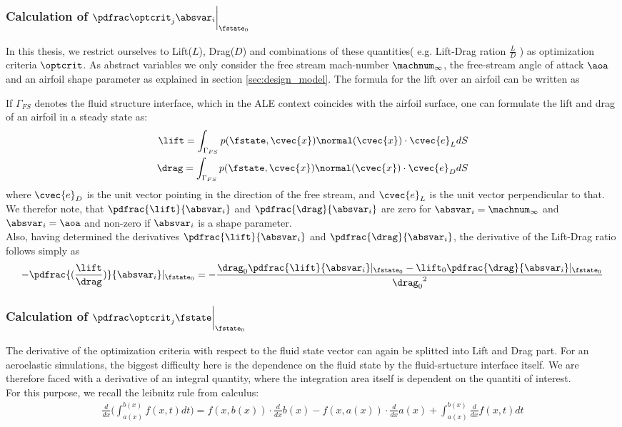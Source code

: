 \documentclass[../main.tex]{subfiles}
\begin{document}
\subsubsection{Calculation of $\PoptcritJBYabsvarI\bigg\rvert_{\fstate_0}$}
In this thesis, we restrict ourselves to Lift($L$), Drag($D$) and combinations of  these quantities( e.g. Lift-Drag ration $\frac{L}{D}$ ) as optimization criteria $\optcrit$. As abstract variables we only consider the free stream mach-number $\machnum_{\infty}$, the free-stream angle of attack $\aoa$ and an airfoil shape parameter as explained in section \ref{sec:design_model}.
The formula for the lift over an airfoil can be written as


If $\Gamma_{FS}$ denotes the fluid structure interface, which in the \ac{ALE} context coincides with the airfoil surface, one can formulate the lift and drag of an airfoil in a steady state as:
\begin{align}\label{eq:lift_and_drag_integrals}
\lift=\int_{\Gamma_{FS}} p(\fstate,\cvec{x}) \normal(\cvec{x})\cdot \cvec{e}_L dS \nonumber\\
\drag=\int_{\Gamma_{FS}} p(\fstate,\cvec{x}) \normal(\cvec{x})\cdot \cvec{e}_D dS \\
\end{align}
where $\cvec{e}_D$ is the unit vector pointing in the direction of the free stream, and $\cvec{e}_L$ is the unit vector perpendicular to that.
We therefor note, that $\pdfrac{\lift}{\absvar_i}$ and $\pdfrac{\drag}{\absvar_i}$ are zero for $\absvar_i=\machnum_{\infty}$ and $\absvar_i=\aoa$ and non-zero if $\absvar_i$ is a shape parameter.\\
Also, having determined the derivatives $\pdfrac{\lift}{\absvar_i}$ and $\pdfrac{\drag}{\absvar_i}$, the derivative of the Lift-Drag ratio follows simply as
\begin{align}\label{eq:lifttoddrag_by_absvar}
-\pdfrac{(\frac{\lift}{\drag})}{\absvar_i}\rvert_{\fstate_0}=
-\frac{\drag_0 \pdfrac{\lift}{\absvar_i}\rvert_{\fstate_0} - \lift_0 \pdfrac{\drag}{\absvar_i}\rvert_{\fstate_0} }{{\drag_0}^2}
\end{align}


\subsubsection{Calculation of $\PoptcritJBYfstate\bigg\rvert_{\fstate_0}$}
The derivative of the optimization criteria with respect to the fluid state vector can again be splitted into Lift and Drag part.
For an aeroelastic simulations, the biggest difficulty here is the dependence on the fluid state by the fluid-srtucture interface itself.
We are therefore faced with a derivative of an integral quantity, where the integration area itself is dependent on the quantiti of interest.\\
For this purpose, we recall the leibnitz rule from calculus:
\begin{align}\label{eq:leibnitz_rule}
\frac{d}{dx}\Big(\int_{a(x)}^{b(x)} f(x,t) dt \Big) =
f(x,b(x))\cdot \frac{d}{dx}b(x)-
f(x,a(x))\cdot \frac{d}{dx}a(x)+
\int_{a(x)}^{b(x)} \frac{d}{dx} f(x,t) dt
\end{align}
\end{document}
